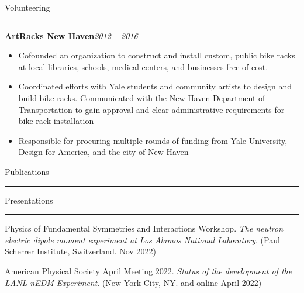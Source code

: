 \begin{singlespace}
{%
\vspace{\baselineskip}
{\large Volunteering}\vspace{0.25\baselineskip}\hrule\vspace{0.75\baselineskip}

\textbf{ArtRacks New Haven}\hfill\textit{2012 -- 2016}
\begin{itemize}[noitemsep,topsep=0pt]
    \item Cofounded an organization to construct and install custom, public bike racks at local libraries, schools, medical centers, and businesses free of cost. 
    \item Coordinated efforts with Yale students and community artists to design and build bike racks. Communicated with the New Haven Department of Transportation to gain approval and clear administrative requirements for bike rack installation
    \item Responsible for procuring multiple rounds of funding from Yale University, Design for America, and the city of New Haven
\end{itemize}

\vspace{\baselineskip}
{\large Publications}\vspace{0.25\baselineskip}\hrule
\setlength{\biblabelsep}{-10pt}
\begin{refsection} 
    \nocite{wong_north_beamline_2023}
    \nocite{lamoreaux_wong_casimir_2015}
    \nocite{akatsuka_characterization_2023}
    \printbibliography[heading=none]
\end{refsection} 

\vspace{0.5\baselineskip}
{\large Presentations}\vspace{0.25\baselineskip}\hrule\vspace{0.75\baselineskip}

Physics of Fundamental Symmetries and Interactions Workshop. \textit{The neutron electric dipole moment experiment at Los Alamos National Laboratory}. (Paul Scherrer Institute, Switzerland. Nov 2022)

\vspace{\baselineskip}

American Physical Society April Meeting 2022. \textit{Status of the development of the LANL nEDM Experiment}. (New York City, NY. and online April 2022)

}
\end{singlespace}
